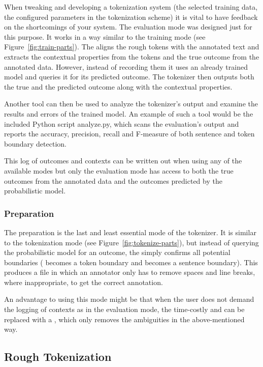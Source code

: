 When tweaking and developing a tokenization system (the selected training data,
the configured parameters in the tokenization scheme) it is vital to have
feedback on the shortcomings of your system. The evaluation mode was designed
just for this purpose. It works in a way similar to the training mode (see
Figure~\ref{fig:train-parts}). The  aligns the rough tokens
with the annotated text and extracts the contextual properties from the tokens
and the true outcome from the annotated data. However, instead of recording
them it uses an already trained model and queries it for its predicted outcome.
The tokenizer then outputs both the true and the predicted outcome along with
the contextual properties.

Another tool can then be used to analyze the tokenizer's output and examine the
results and errors of the trained model. An example of such a tool would be the
included Python script analyze.py, which scans the evaluation's output and
reports the accuracy, precision, recall and F-measure of both sentence and
token boundary detection.

This log of outcomes and contexts can be written out when using any of the
available modes but only the evaluation mode has access to both the true
outcomes from the annotated data and the outcomes predicted by the
probabilistic model.

\subsubsection{Preparation}
\label{ssec:impl-modes-prepare}

The preparation is the last and least essential mode of the tokenizer. It is
similar to the tokenization mode (see Figure~\ref{fig:tokenize-parts}), but
instead of querying the probabilistic model for an outcome, the
 simply confirms all potential boundaries (\maysplit{}
becomes a token boundary and \maybreaksentence{} becomes a sentence boundary).
This produces a file in which an annotator only has to remove spaces and line
breaks, where inappropriate, to get the correct annotation.

An advantage to using this mode might be that when the user does not demand the
logging of contexts as in the evaluation mode, the time-costly
 and  can be replaced with a
, which only removes the ambiguities in the
above-mentioned way.

\subsection{Rough Tokenization}
\label{sec:impl-roughtok}

